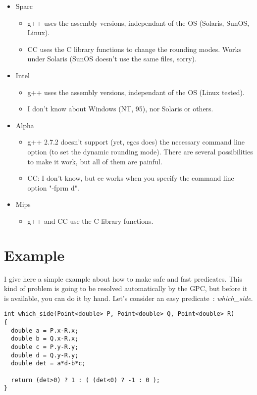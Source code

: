 \documentclass{book}
\begin{document}
\begin{itemize}
\item Sparc
\begin{itemize}
\item g++ uses the assembly versions, independant of the OS (Solaris, SunOS,
      Linux).
\item CC uses the C library functions to change the rounding modes.  Works
      under Solaris (SunOS doesn't use the same files, sorry).
\end{itemize}
\item Intel
\begin{itemize}
\item g++ uses the assembly versions, independant of the OS (Linux tested).
\item I don't know about Windows (NT, 95), nor Solaris or others.
\end{itemize}
\item Alpha
\begin{itemize}
\item g++ 2.7.2 doesn't support (yet, egcs does) the necessary command line
	option (to set the dynamic rounding mode).  There are several
	possibilities to make it work, but all of them are painful.
\item CC: I don't know, but cc works when you specify the command line option
      "-fprm d".
\end{itemize}
\item Mips
\begin{itemize}
\item g++ and CC use the C library functions.
\end{itemize}
\end{itemize}


\section{Example}

I give here a simple example about how to make safe and fast predicates.
This kind of problem is going to be resolved automatically by the GPC,
but before it is available, you can do it by hand.
Let's consider an easy predicate~: {\it which\_side}.

\begin{verbatim}
int which_side(Point<double> P, Point<double> Q, Point<double> R)
{
  double a = P.x-R.x;
  double b = Q.x-R.x;
  double c = P.y-R.y;
  double d = Q.y-R.y;
  double det = a*d-b*c;

  return (det>0) ? 1 : ( (det<0) ? -1 : 0 );
}
\end{verbatim}
\end{document}
